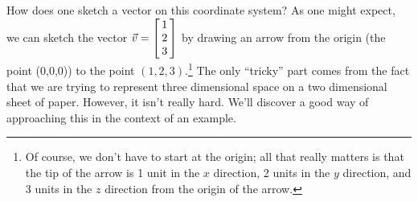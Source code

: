 How does one sketch a vector on this coordinate system? As one might expect, we can sketch the vector $\vv = \bmx{c} 1\\2\\3\emx$ by drawing an arrow from the origin (the point (0,0,0)) to the point $(1,2,3)$.\footnote{Of course, we don't have to start at the origin; all that really matters is that the tip of the arrow is 1 unit in the $x$ direction, 2 units in the $y$ direction, and 3 units in the $z$ direction from the origin of the arrow.} The only ``tricky'' part comes from the fact that we are trying to represent three dimensional space on a two dimensional sheet of paper. However, it isn't really hard. We'll discover a good way of approaching this in the context of an example.\\

